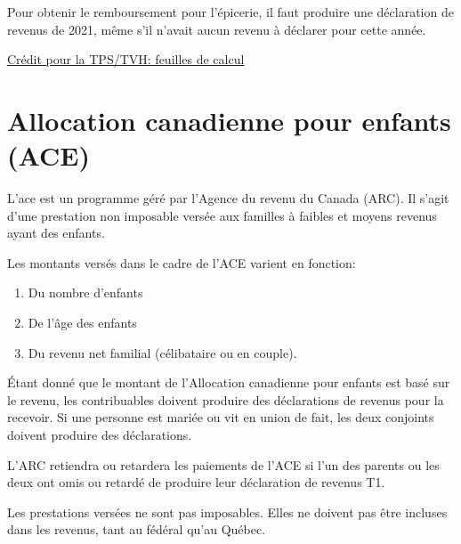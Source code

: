 Pour obtenir le remboursement pour l'épicerie, il faut produire une déclaration de revenus de 2021, même s'il n'avait aucun revenu à déclarer pour cette année.

\cat \href{https://www.canada.ca/fr/agence-revenu/services/prestations-enfants-familles/credit-taxe-produits-services-taxe-vente-harmonisee-tps-tvh/credit-tps-tvh-feuilles-calcul.html}{Crédit pour la TPS/TVH: feuilles de calcul}



\section{Allocation canadienne pour enfants (ACE)}
\begin{intro}
	L'\acrfull{ace} est un programme géré par l'Agence du revenu du Canada (ARC). Il s'agit d'une prestation non imposable versée aux familles à faibles et moyens revenus ayant des enfants.
\end{intro}

Les montants versés dans le cadre de l'ACE varient en fonction:
\begin{enumerate}
	\item Du nombre d'enfants 
	\item De l'âge des enfants 
	\item Du revenu net familial (célibataire ou en couple).
\end{enumerate}

Étant donné que le montant de l'Allocation canadienne pour enfants est basé sur le revenu, les contribuables doivent produire des déclarations de revenus pour la recevoir. Si une personne est mariée ou vit en union de fait, les deux conjoints doivent produire des déclarations.

\begin{note}
	L'ARC retiendra ou retardera les paiements de l'ACE si l'un des parents ou les deux ont omis ou retardé de produire leur déclaration de revenus T1.
\end{note}

Les prestations versées ne sont pas imposables. Elles ne doivent pas être incluses dans les revenus, tant au fédéral qu'au Québec.


